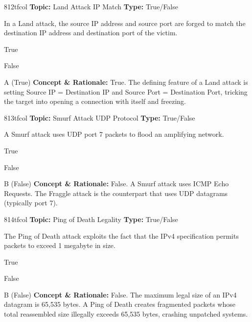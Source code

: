 \begin{qcard}{812}{tfcol}
\textcolor{darkslate!75}{\small\textbf{Topic:} Land Attack IP Match \hfill \textbf{Type:} True/False}\vspace{0.4em}\par
In a Land attack, the source IP address and source port are forged to match the destination IP address and destination port of the victim.
\begin{qoptions}
\item True
\item False
\end{qoptions}
\end{qcard}
\nopagebreak
\begin{explainbox}{A (True)}
\textbf{Concept \& Rationale:} True. The defining feature of a Land attack is setting Source IP = Destination IP and Source Port = Destination Port, tricking the target into opening a connection with itself and freezing.
\end{explainbox}

\begin{qcard}{813}{tfcol}
\textcolor{darkslate!75}{\small\textbf{Topic:} Smurf Attack UDP Protocol \hfill \textbf{Type:} True/False}\vspace{0.4em}\par
A Smurf attack uses UDP port 7 packets to flood an amplifying network.
\begin{qoptions}
\item True
\item False
\end{qoptions}
\end{qcard}
\nopagebreak
\begin{explainbox}{B (False)}
\textbf{Concept \& Rationale:} False. A Smurf attack uses ICMP Echo Requests. The Fraggle attack is the counterpart that uses UDP datagrams (typically port 7).
\end{explainbox}

\begin{qcard}{814}{tfcol}
\textcolor{darkslate!75}{\small\textbf{Topic:} Ping of Death Legality \hfill \textbf{Type:} True/False}\vspace{0.4em}\par
The Ping of Death attack exploits the fact that the IPv4 specification permits packets to exceed 1 megabyte in size.
\begin{qoptions}
\item True
\item False
\end{qoptions}
\end{qcard}
\nopagebreak
\begin{explainbox}{B (False)}
\textbf{Concept \& Rationale:} False. The maximum legal size of an IPv4 datagram is 65,535 bytes. A Ping of Death creates fragmented packets whose total reassembled size illegally exceeds 65,535 bytes, crashing unpatched systems.
\end{explainbox}

